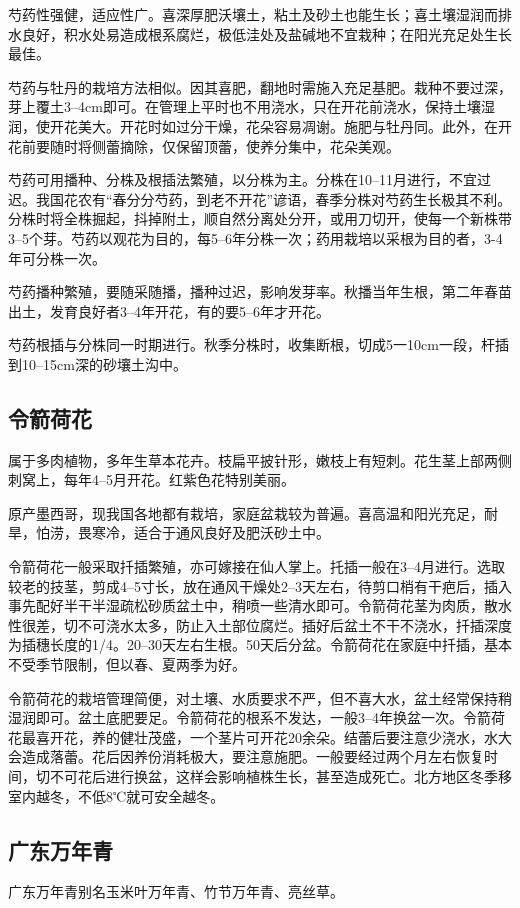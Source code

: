 \documentclass{ctexbook}
\begin{document}
芍药性强健，适应性广。喜深厚肥沃壤土，粘土及砂土也能生长；喜土壤湿润而排水良好，积水处易造成根系腐烂，极低洼处及盐碱地不宜栽种；在阳光充足处生长最佳。

芍药与牡丹的栽培方法相似。因其喜肥，翻地时需施入充足基肥。栽种不要过深，芽上覆土3--4cm即可。在管理上平时也不用浇水，只在开花前浇水，保持土壤湿润，使开花美大。开花时如过分干燥，花朵容易凋谢。施肥与牡丹同。此外，在开花前要随时将侧蕾摘除，仅保留顶蕾，使养分集中，花朵美观。

芍药可用播种、分株及根插法繁殖，以分株为主。分株在10--11月进行，不宜过迟。我国花农有“春分分芍药，到老不开花”谚语，春季分株对芍药生长极其不利。分株时将全株掘起，抖掉附土，顺自然分离处分开，或用刀切开，使每一个新株带3--5个芽。芍药以观花为目的，每5--6年分株一次；药用栽培以采根为目的者，3-4年可分株一次。

芍药播种繁殖，要随采随播，播种过迟，影响发芽率。秋播当年生根，第二年春苗出土，发育良好者3--4年开花，有的要5--6年才开花。

芍药根插与分株同一时期进行。秋季分株时，收集断根，切成5一10cm一段，杆插到10--15cm深的砂壤土沟中。
\subsection{令箭荷花}
属于多肉植物，多年生草本花卉。枝扁平披针形，嫩枝上有短刺。花生茎上部两侧刺窝上，每年4--5月开花。红紫色花特别美丽。

原产墨西哥，现我国各地都有栽培，家庭盆栽较为普遍。喜高温和阳光充足，耐旱，怕涝，畏寒冷，适合于通风良好及肥沃砂土中。

令箭荷花一般采取扦插繁殖，亦可嫁接在仙人掌上。托插一般在3--4月进行。选取较老的技茎，剪成4--5寸长，放在通风干燥处2--3天左右，待剪口梢有干疤后，插入事先配好半干半湿疏松砂质盆土中，稍喷一些清水即可。令箭荷花茎为肉质，散水性很差，切不可浇水太多，防止入土部位腐烂。插好后盆土不干不浇水，扦插深度为插穗长度的1/4。20--30天左右生根。50天后分盆。令箭荷花在家庭中扦插，基本不受季节限制，但以春、夏两季为好。

令箭荷花的栽培管理简便，对土壤、水质要求不严，但不喜大水，盆土经常保持稍湿润即可。盆土底肥要足。令箭荷花的根系不发达，一般3--4年换盆一次。令箭荷花最喜开花，养的健壮茂盛，一个茎片可开花20余朵。结蕾后要注意少浇水，水大会造成落蕾。花后因养份消耗极大，要注意施肥。一般要经过两个月左右恢复时间，切不可花后进行换盆，这样会影响植株生长，甚至造成死亡。北方地区冬季移室内越冬，不低8℃就可安全越冬。
\subsection{广东万年青}
广东万年青别名玉米叶万年青、竹节万年青、亮丝草。
\end{document}
